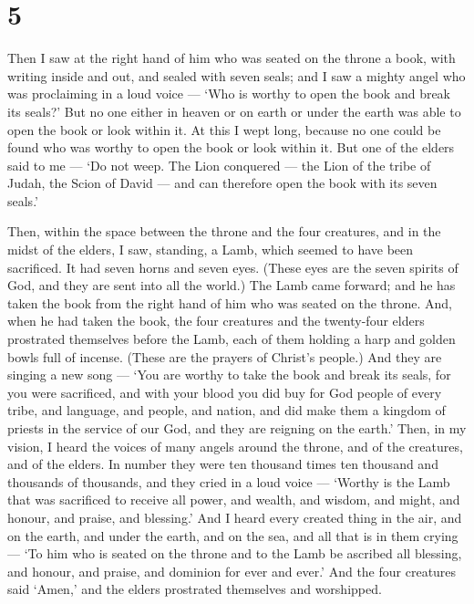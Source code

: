 \hypertarget{section-4}{%
\section{5}\label{section-4}}

 Then I saw at the right hand of him who was seated on the
throne a book, with writing inside and out, and sealed with seven seals;
 and I saw a mighty angel who was proclaiming in a loud
voice --- `Who is worthy to open the book and break its seals?'
 But no one either in heaven or on earth or under the earth
was able to open the book or look within it.  At this I wept
long, because no one could be found who was worthy to open the book or
look within it.  But one of the elders said to me --- `Do
not weep. The Lion conquered --- the Lion of the tribe of Judah, the
Scion of David --- and can therefore open the book with its seven
seals.'

 Then, within the space between the throne and the four
creatures, and in the midst of the elders, I saw, standing, a Lamb,
which seemed to have been sacrificed. It had seven horns and seven eyes.
(These eyes are the seven spirits of God, and they are sent into all the
world.)  The Lamb came forward; and he has taken the book
from the right hand of him who was seated on the throne. 
And, when he had taken the book, the four creatures and the twenty-four
elders prostrated themselves before the Lamb, each of them holding a
harp and golden bowls full of incense. (These are the prayers of
Christ's people.)  And they are singing a new song --- `You
are worthy to take the book and break its seals, for you were
sacrificed, and with your blood you did buy for God people of every
tribe, and language, and people, and nation,  and did make
them a kingdom of priests in the service of our God, and they are
reigning on the earth.'  Then, in my vision, I heard the
voices of many angels around the throne, and of the creatures, and of
the elders. In number they were ten thousand times ten thousand and
thousands of thousands,  and they cried in a loud voice ---
`Worthy is the Lamb that was sacrificed to receive all power, and
wealth, and wisdom, and might, and honour, and praise, and blessing.'
 And I heard every created thing in the air, and on the
earth, and under the earth, and on the sea, and all that is in them
crying --- `To him who is seated on the throne and to the Lamb be
ascribed all blessing, and honour, and praise, and dominion for ever and
ever.'  And the four creatures said `Amen,' and the elders
prostrated themselves and worshipped.

